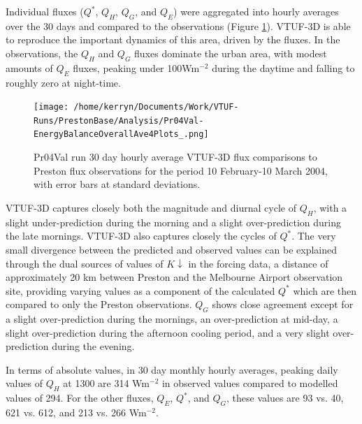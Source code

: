\documentclass[final,3p,times,authoryear]{elsarticle}
\begin{document}
Individual fluxes ($Q^{*}$, $Q_{H}$, $Q_{G}$, and $Q_{E}$) were aggregated into hourly averages over the 30 days and compared to the observations (Figure \ref{fig:Preston30Day4}). VTUF-3D is able to reproduce the important dynamics of this area, driven by the fluxes. In the observations, the $Q_{H}$ and $Q_{G}$ fluxes dominate the urban area, with modest amounts of $Q_{E}$ fluxes, peaking under 100Wm$^{-2}$ during the daytime and falling to roughly zero at night-time. 


\begin{figure}[!htbp] 
\texttt{[image: /home/kerryn/Documents/Work/VTUF-Runs/PrestonBase/Analysis/Pr04Val-EnergyBalanceOverallAve4Plots\_.png]}
\caption{Pr04Val run 30 day hourly average VTUF-3D flux comparisons to Preston flux observations for the period 10 February-10 March 2004, with error bars at standard deviations. \label{fig:Preston30Day4} }     
\end{figure}



VTUF-3D captures closely both the magnitude and diurnal cycle of $Q_{H}$, with a slight under-prediction during the morning and a slight over-prediction during the late mornings. VTUF-3D also captures closely the cycles of $Q^{*}$. The very small divergence between the predicted and observed values can be explained through the dual sources of values of $K\downarrow$ in the forcing data, a distance of approximately 20 km between Preston and the Melbourne Airport observation site, providing varying values as a component of the calculated $Q^{*}$ which are then compared to only the Preston observations. $Q_{G}$ shows close agreement except for a slight over-prediction during the mornings, an over-prediction at mid-day, a slight over-prediction during the afternoon cooling period, and a very slight over-prediction during the evening.

In terms of absolute values, in 30 day monthly hourly averages, peaking daily values of $Q_{H}$ at 1300 are 314 Wm$^{-2}$ in observed values compared to modelled values of 294. For the other fluxes, $Q_{E}$, $Q^{*}$, and $Q_{G}$, these values are 93 vs. 40, 621 vs. 612, and 213 vs. 266 Wm$^{-2}$.
\end{document}
